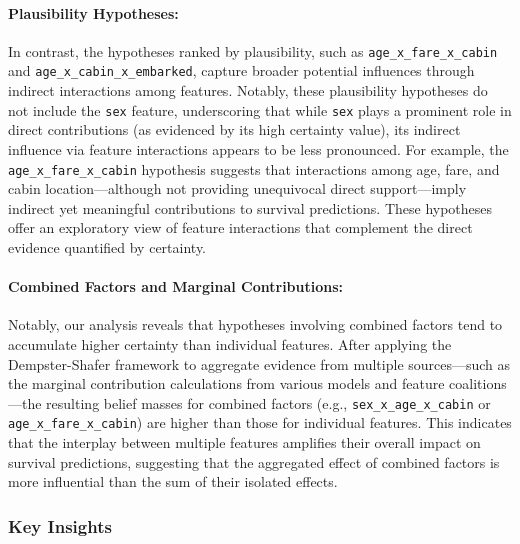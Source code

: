 \documentclass[acmlarge]{acmart}
\begin{document}
\paragraph{Plausibility Hypotheses:}  
In contrast, the hypotheses ranked by plausibility, such as \texttt{age\_x\_fare\_x\_cabin} and \texttt{age\_x\_cabin\_x\_embarked}, capture broader potential influences through indirect interactions among features. Notably, these plausibility hypotheses do not include the \texttt{sex} feature, underscoring that while \texttt{sex} plays a prominent role in direct contributions (as evidenced by its high certainty value), its indirect influence via feature interactions appears to be less pronounced. For example, the \texttt{age\_x\_fare\_x\_cabin} hypothesis suggests that interactions among age, fare, and cabin location—although not providing unequivocal direct support—imply indirect yet meaningful contributions to survival predictions. These hypotheses offer an exploratory view of feature interactions that complement the direct evidence quantified by certainty.



\paragraph{Combined Factors and Marginal Contributions:}  
Notably, our analysis reveals that hypotheses involving combined factors tend to accumulate higher certainty than individual features. After applying the Dempster-Shafer framework to aggregate evidence from multiple sources—such as the marginal contribution calculations from various models and feature coalitions—the resulting belief masses for combined factors (e.g., \texttt{sex\_x\_age\_x\_cabin} or \texttt{age\_x\_fare\_x\_cabin}) are higher than those for individual features. This indicates that the interplay between multiple features amplifies their overall impact on survival predictions, suggesting that the aggregated effect of combined factors is more influential than the sum of their isolated effects.

\subsubsection{Key Insights}
\end{document}
